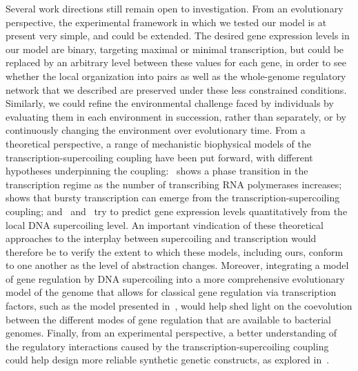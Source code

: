 Several work directions still remain open to investigation.
From an evolutionary perspective, the experimental framework in which we tested our model is at present very simple, and could be extended.
The desired gene expression levels in our model are binary, targeting maximal or minimal transcription, but could be replaced by an arbitrary level between these values for each gene, in order to see whether the local organization into pairs as well as the whole-genome regulatory network that we described are preserved under these less constrained conditions.
Similarly, we could refine the environmental challenge faced by individuals by evaluating them in each environment in succession, rather than separately, or by continuously changing the environment over evolutionary time.
From a theoretical perspective, a range of mechanistic biophysical models of the transcription-supercoiling coupling have been put forward, with different hypotheses underpinning the coupling:~\cite{brackley2016} shows a phase transition in the transcription regime as the number of transcribing RNA polymerases increases;~\cite{sevier2021} shows that bursty transcription can emerge from the transcription-supercoiling coupling; and~\cite{meyer2014} and~\cite{elhoudaigui2019} try to predict gene expression levels quantitatively from the local DNA supercoiling level.
An important vindication of these theoretical approaches to the interplay between supercoiling and transcription would therefore be to verify the extent to which these models, including ours, conform to one another as the level of abstraction changes.
Moreover, integrating a model of gene regulation by DNA supercoiling into a more comprehensive evolutionary model of the genome that allows for classical gene regulation via transcription factors, such as the model presented in~\cite{crombach2008}, would help shed light on the coevolution between the different modes of gene regulation that are available to bacterial genomes.
Finally, from an experimental perspective, a better understanding of the regulatory interactions caused by the transcription-supercoiling coupling could help design more reliable synthetic genetic constructs, as explored in~\cite{johnstone2022}.

